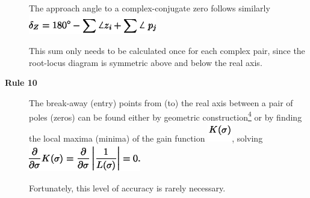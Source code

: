 \documentclass[16pt]{article}
\begin{document}
\begin{description}
	The approach angle to a complex-conjugate zero follows similarly\\
	
	\includegraphics[width=2.19792in,height=0.34375in]{./The Root Locus Rules_files/img9.png}
	
	This sum only needs to be calculated once for each complex pair, since
	the root-locus diagram is symmetric above and below the real axis.
	\item[\textbf{Rule 10} ]
	The break-away (entry) points from (to) the real axis between a pair of
	poles (zeros) can be found either by geometric
	construction\href{http://www.mit.edu/people/klund/weblatex/footnode.html\#foot2293}{\textsuperscript{4}}
	or by finding the local maxima (minima) of the gain function
	\includegraphics[width=0.41667in,height=0.32292in]{./The Root Locus Rules_files/img10.png},
	solving \protect\hypertarget{2294}{}{~}\\
	
	\includegraphics[width=1.92708in,height=0.46875in]{./The Root Locus Rules_files/img11.png}
	
	Fortunately, this level of accuracy is rarely necessary.
\end{description}
\end{document}
